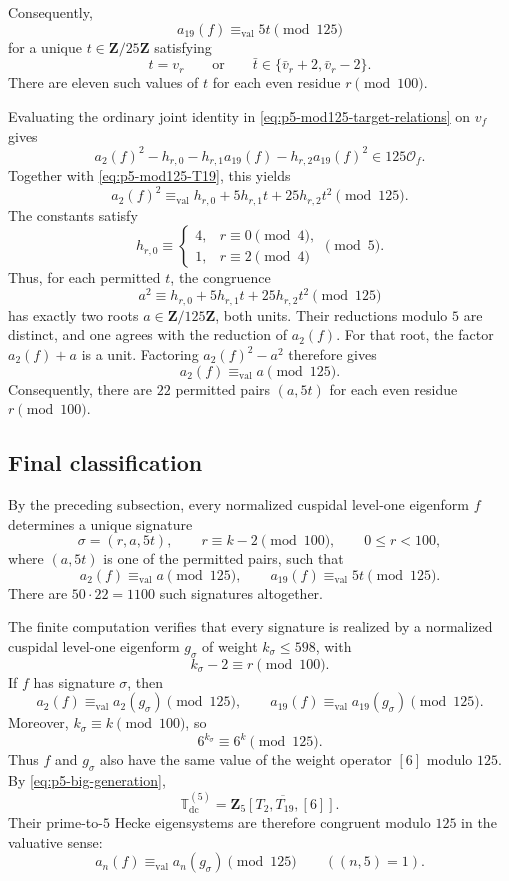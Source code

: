 \documentclass[11pt]{article}
\theoremstyle{plain}
\theoremstyle{definition}
\theoremstyle{remark}
\numberwithin{equation}{section}
\begin{document}
Consequently, \begin{equation} a_{19}(f)\equiv_{\mathrm{val}}5t\pmod{125} \label{eq:p5-mod125-T19} \end{equation} for a unique \(t\in\mathbf Z/25\mathbf Z\) satisfying \[ t=v_r \qquad\text{or}\qquad \bar t\in\{\bar v_r+2,\bar v_r-2\}. \] There are eleven such values of \(t\) for each even residue \(r\pmod{100}\).

Evaluating the ordinary joint identity in \eqref{eq:p5-mod125-target-relations} on \(v_f\) gives \[ a_2(f)^2-h_{r,0}-h_{r,1}a_{19}(f) -h_{r,2}a_{19}(f)^2\in125\mathcal O_f. \] Together with \eqref{eq:p5-mod125-T19}, this yields \[ a_2(f)^2\equiv_{\mathrm{val}} h_{r,0}+5h_{r,1}t+25h_{r,2}t^2 \pmod{125}. \] The constants satisfy \[ h_{r,0}\equiv \begin{cases} 4,&r\equiv0\pmod4,\\ 1,&r\equiv2\pmod4 \end{cases} \pmod5. \] Thus, for each permitted \(t\), the congruence \[ a^2\equiv h_{r,0}+5h_{r,1}t+25h_{r,2}t^2 \pmod{125} \] has exactly two roots \(a\in\mathbf Z/125\mathbf Z\), both units. Their reductions modulo \(5\) are distinct, and one agrees with the reduction of \(a_2(f)\). For that root, the factor \(a_2(f)+a\) is a unit. Factoring \(a_2(f)^2-a^2\) therefore gives \begin{equation} a_2(f)\equiv_{\mathrm{val}}a\pmod{125}. \label{eq:p5-mod125-T2} \end{equation} Consequently, there are \(22\) permitted pairs \((a,5t)\) for each even residue \(r\pmod{100}\).

\subsection{Final classification}  By the preceding subsection, every normalized cuspidal level-one eigenform \(f\) determines a unique signature \[ \sigma=(r,a,5t), \qquad r\equiv k-2\pmod{100},\qquad 0\leq r<100, \] where \((a,5t)\) is one of the permitted pairs, such that \[ a_2(f)\equiv_{\mathrm{val}}a\pmod{125}, \qquad a_{19}(f)\equiv_{\mathrm{val}}5t\pmod{125}. \] There are \(50\cdot22=1100\) such signatures altogether.

The finite computation \cite[\url{https://github.com/nrustom/hecke-congruences/tree/main/strong_signatures/p5_m3}] {RustomHeckeCongruences} verifies that every signature is realized by a normalized cuspidal level-one eigenform \(g_\sigma\) of weight \(k_\sigma\leq598\), with \[ k_\sigma-2\equiv r\pmod{100}. \] If \(f\) has signature \(\sigma\), then \[ a_2(f)\equiv_{\mathrm{val}}a_2(g_\sigma)\pmod{125}, \qquad a_{19}(f)\equiv_{\mathrm{val}}a_{19}(g_\sigma)\pmod{125}. \] Moreover, \(k_\sigma\equiv k\pmod{100}\), so \[ 6^{k_\sigma}\equiv6^k\pmod{125}. \] Thus \(f\) and \(g_\sigma\) also have the same value of the weight operator \([6]\) modulo \(125\). By \eqref{eq:p5-big-generation}, \[ \mathbb T_{\mathrm{dc}}^{(5)} =\overline{\mathbf Z_5[T_2,T_{19},[6]]}. \] Their prime-to-\(5\) Hecke eigensystems are therefore congruent modulo \(125\) in the valuative sense: \[ a_n(f)\equiv_{\mathrm{val}}a_n(g_\sigma)\pmod{125} \qquad((n,5)=1). \]
\end{document}
